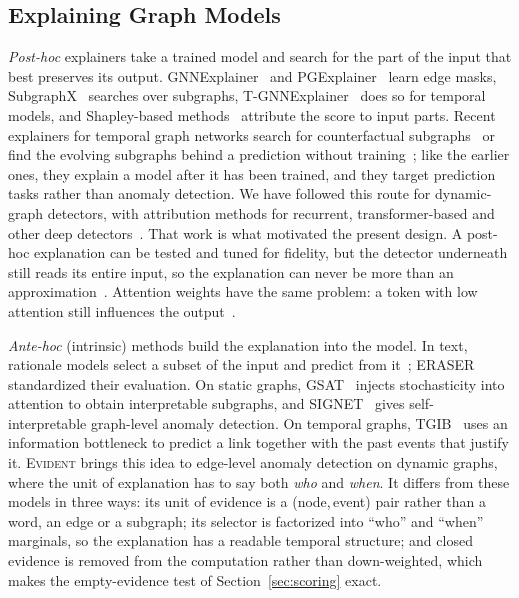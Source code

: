 \documentclass[pdflatex,sn-basic]{sn-jnl}
\newcommand{\evident}{\textsc{Evident}}
\theoremstyle{definition}
\theoremstyle{plain}
\begin{document}
\subsection{Explaining Graph Models}
\emph{Post-hoc} explainers take a trained model and search for the part of the
input that best preserves its output. GNNExplainer~\cite{gnnexplainer} and
PGExplainer~\cite{pgexplainer} learn edge masks, SubgraphX~\cite{subgraphx}
searches over subgraphs, T-GNNExplainer~\cite{tgnnexplainer} does so for
temporal models, and Shapley-based methods~\cite{shap} attribute the score to
input parts. Recent explainers for temporal graph networks search for
counterfactual subgraphs~\cite{qu2025cody} or find the evolving subgraphs
behind a prediction without training~\cite{lu2026temgx}; like the earlier
ones, they explain a model after it has been trained, and they target
prediction tasks rather than anomaly detection. We have followed this route for dynamic-graph detectors, with
attribution methods for recurrent, transformer-based and other deep
detectors~\cite{nekka_dsta,nekka_xtaddy,nekka_amortised}. That work is what motivated the present design. A post-hoc
explanation can be tested and tuned for fidelity, but the detector underneath
still reads its entire input, so the explanation can never be more than an
approximation~\cite{rudin2019}. Attention weights have the same problem: a
token with low attention still influences the output~\cite{jain2019}.

\emph{Ante-hoc} (intrinsic) methods build the explanation into the model. In
text, rationale models select a subset of the input and predict from
it~\cite{lei2016}; ERASER~\cite{eraser} standardized their evaluation. On
static graphs, GSAT~\cite{gsat} injects stochasticity into attention to obtain
interpretable subgraphs, and SIGNET~\cite{signet} gives self-interpretable
graph-level anomaly detection. On temporal graphs, TGIB~\cite{seo2024tgib}
uses an information bottleneck to predict a link together with the past events
that justify it. \evident{} brings this idea to edge-level
anomaly detection on dynamic graphs, where the unit of explanation has to say
both \emph{who} and \emph{when}. It differs from these models in three ways:
its unit of evidence is a (node,\,event) pair rather than a word, an edge or a
subgraph; its selector is factorized into ``who'' and ``when'' marginals, so
the explanation has a readable temporal structure; and closed evidence is
removed from the computation rather than down-weighted, which makes the
empty-evidence test of Section~\ref{sec:scoring} exact.
\end{document}
